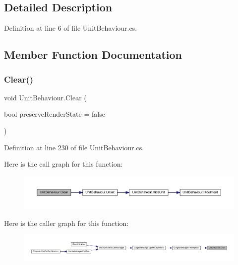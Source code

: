 \subsection{Detailed Description}


Definition at line 6 of file Unit\+Behaviour.\+cs.



\subsection{Member Function Documentation}
\mbox{\label{class_unit_behaviour_a89fa86241b11f695b89b7143fa4f88ec}} 
\subsubsection{\texorpdfstring{Clear()}{Clear()}}
{\footnotesize\ttfamily void Unit\+Behaviour.\+Clear (\begin{DoxyParamCaption}\item[{bool}]{preserve\+Render\+State = {\ttfamily false} }\end{DoxyParamCaption})}



Definition at line 230 of file Unit\+Behaviour.\+cs.

Here is the call graph for this function\+:
\nopagebreak
\begin{figure}[H]
\begin{center}
\leavevmode
\includegraphics[width=350pt]{class_unit_behaviour_a89fa86241b11f695b89b7143fa4f88ec_cgraph}
\end{center}
\end{figure}
Here is the caller graph for this function\+:
\nopagebreak
\begin{figure}[H]
\begin{center}
\leavevmode
\includegraphics[width=350pt]{class_unit_behaviour_a89fa86241b11f695b89b7143fa4f88ec_icgraph}
\end{center}
\end{figure}
\mbox{\label{class_unit_behaviour_a9ba9de594c111333c048b477dd295025}} 
